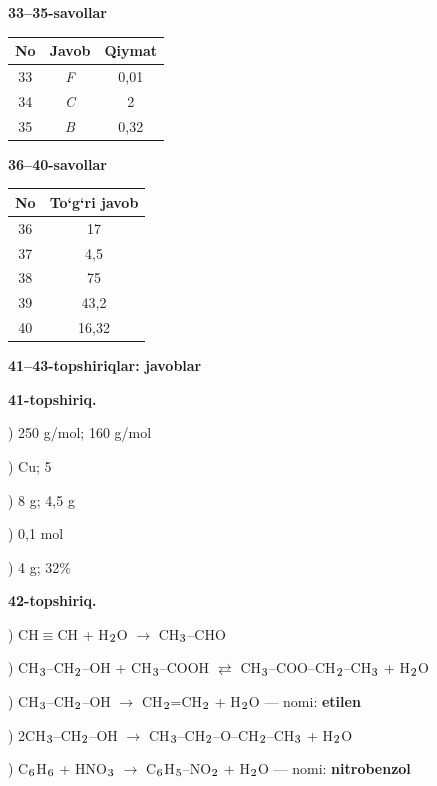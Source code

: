 \documentclass[11pt,a4paper]{article}
\renewcommand{\textsubscript}[1]{\ensuremath{_{\text{\fontsize{8}{8}\selectfont #1}}}}
\begin{document}
\noindent\textbf{33--35-savollar}\par\smallskip
\noindent\begin{tabular}{|c|c|c|}\hline \textbf{No} & \textbf{Javob} & \textbf{Qiymat}\\\hline
33 & \textsl{F} & 0,01\\\hline
34 & \textsl{C} & 2\\\hline
35 & \textsl{B} & 0,32\\\hline
\end{tabular}\par\medskip
\noindent\textbf{36--40-savollar}\par\smallskip
\noindent\begin{tabular}{|c|c|}\hline \textbf{No} & \textbf{To`g`ri javob}\\\hline
36 & 17\\\hline
37 & 4,5\\\hline
38 & 75\\\hline
39 & 43,2\\\hline
40 & 16,32\\\hline
\end{tabular}\par\medskip
\noindent\textbf{41--43-topshiriqlar: javoblar}\par\smallskip
\noindent\textbf{41-topshiriq.}\par
{}) 250 g/mol; 160 g/mol\par
{}) Cu; 5\par
{}) 8 g; 4,5 g\par
{}) 0,1 mol\par
{}) 4 g; 32\%\par
\noindent\textbf{42-topshiriq.}\par
{}) CH$\equiv$CH + H\textsubscript{2}O $\to$ CH\textsubscript{3}--CHO\par
{}) CH\textsubscript{3}--CH\textsubscript{2}--OH + CH\textsubscript{3}--COOH $\rightleftarrows$ CH\textsubscript{3}--COO--CH\textsubscript{2}--CH\textsubscript{3} + H\textsubscript{2}O\par
{}) CH\textsubscript{3}--CH\textsubscript{2}--OH $\to$ CH\textsubscript{2}=CH\textsubscript{2} + H\textsubscript{2}O --- nomi: \textbf{etilen}\par
{}) 2CH\textsubscript{3}--CH\textsubscript{2}--OH $\to$ CH\textsubscript{3}--CH\textsubscript{2}--O--CH\textsubscript{2}--CH\textsubscript{3} + H\textsubscript{2}O\par
{}) C\textsubscript{6}H\textsubscript{6} + HNO\textsubscript{3} $\to$ C\textsubscript{6}H\textsubscript{5}--NO\textsubscript{2} + H\textsubscript{2}O --- nomi: \textbf{nitrobenzol}\par
\end{document}
